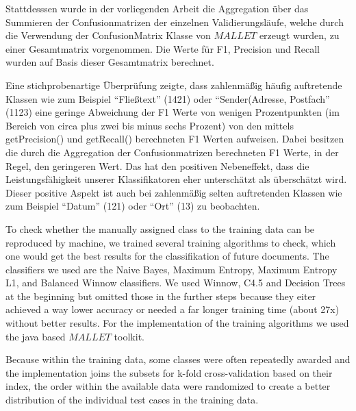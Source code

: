 Stattdesssen wurde in der vorliegenden Arbeit die Aggregation über das Summieren der Confusionmatrizen der einzelnen Validierungsläufe, welche durch die Verwendung der ConfusionMatrix Klasse von $MALLET$ erzeugt wurden, zu einer Gesamtmatrix vorgenommen. Die Werte für F1, Precision und Recall wurden auf Basis dieser Gesamtmatrix berechnet. 

Eine stichprobenartige Überprüfung zeigte, dass zahlenmäßig häufig auftretende Klassen wie zum Beispiel "`Fließtext"' (1421) oder "`Sender(Adresse, Postfach"' (1123) eine geringe Abweichung der F1 Werte von wenigen Prozentpunkten (im Bereich von circa plus zwei bis minus sechs Prozent) von den mittels getPrecision() und getRecall() berechneten F1 Werten aufweisen. Dabei besitzen die durch die Aggregation der Confusionmatrizen berechneten F1 Werte, in der Regel, den geringeren Wert. Das hat den positiven Nebeneffekt, dass die Leistungsfähigkeit unserer Klassifikatoren eher unterschätzt als überschätzt wird. Dieser positive Aspekt ist auch bei zahlenmäßig selten auftretenden Klassen wie zum Beispiel "`Datum"' (121) oder "`Ort"' (13) zu beobachten.


\vspace*{2cm}


To check whether the manually assigned class to the training data can be reproduced by machine, we trained several training algorithms to check, which one would get the best results for the classifikation of future documents. The classifiers we used are the Naive Bayes, Maximum Entropy, Maximum Entropy L1, and Balanced Winnow classifiers. We used Winnow, C4.5 and Decision Trees at the beginning but omitted those in the further steps because they eiter achieved a way lower accuracy or needed a far longer training time (about 27x) without better results. For the implementation of the training algorithms we used the java based $MALLET$ toolkit. 


Because within the training data, some classes were often repeatedly awarded and the implementation joins the subsets for k-fold cross-validation based on their index, the order within the available data were randomized to create a better distribution of the individual test cases in the training data. 

